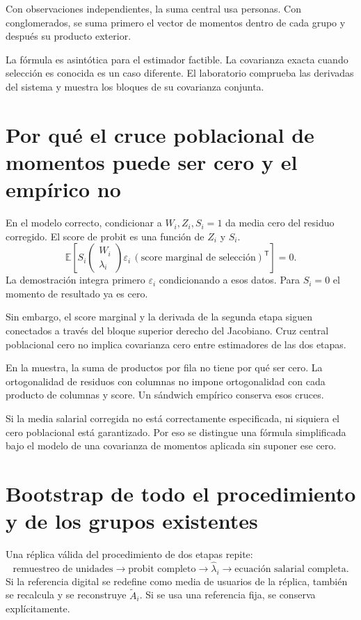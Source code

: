 \documentclass[11pt,a4paper]{article}
\newcommand{\E}{\mathbb E}
\begin{document}
Con observaciones independientes, la suma central usa personas. Con conglomerados, se suma primero el vector de momentos dentro de cada grupo y después su producto exterior.

La fórmula es asintótica para el estimador factible. La covarianza exacta cuando selección es conocida es un caso diferente. El laboratorio comprueba las derivadas del sistema y muestra los bloques de su covarianza conjunta.

\clearpage
\section{Por qué el cruce poblacional de momentos puede ser cero y el empírico no}

En el modelo correcto, condicionar a $W_i,Z_i,S_i=1$ da media cero del residuo corregido. El score de probit es una función de $Z_i$ y $S_i$.
\[
\E\left[S_i\begin{pmatrix}W_i\\\lambda_i\end{pmatrix}
\varepsilon_i\,(\text{score marginal de selección})^{\mathsf T}\right]=0.
\]
La demostración integra primero $\varepsilon_i$ condicionando a esos datos. Para $S_i=0$ el momento de resultado ya es cero.

Sin embargo, el score marginal y la derivada de la segunda etapa siguen conectados a través del bloque superior derecho del Jacobiano. Cruz central poblacional cero no implica covarianza cero entre estimadores de las dos etapas.

En la muestra, la suma de productos por fila no tiene por qué ser cero. La ortogonalidad de residuos con columnas no impone ortogonalidad con cada producto de columnas y score. Un sándwich empírico conserva esos cruces.

Si la media salarial corregida no está correctamente especificada, ni siquiera el cero poblacional está garantizado. Por eso se distingue una fórmula simplificada bajo el modelo de una covarianza de momentos aplicada sin suponer ese cero.

\clearpage
\section{Bootstrap de todo el procedimiento y de los grupos existentes}

Una réplica válida del procedimiento de dos etapas repite:
\[
\text{remuestreo de unidades}
\longrightarrow\text{probit completo}
\longrightarrow\widehat\lambda_i
\longrightarrow\text{ecuación salarial completa}.
\]
Si la referencia digital se redefine como media de usuarios de la réplica, también se recalcula y se reconstruye $\widetilde A_i$. Si se usa una referencia fija, se conserva explícitamente.
\end{document}
